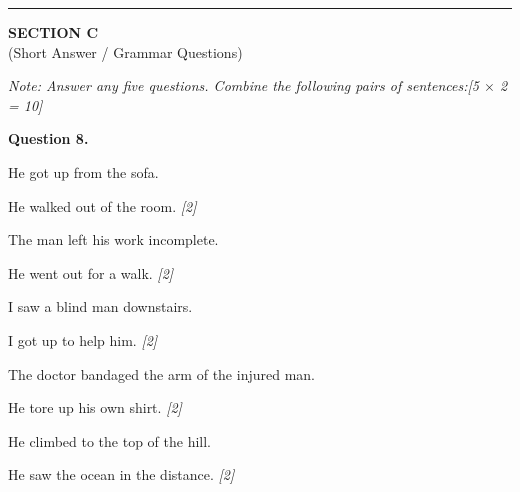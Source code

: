 \documentclass[11pt,a4paper]{article}
\newcommand{\pts}[1]{\hfill \textit{[#1]}}
\begin{document}
\bigskip
\rule{\linewidth}{0.2pt}
\bigskip

\begin{center}
  {\large\bfseries SECTION C}\\[2pt]
  {\normalsize (Short Answer / Grammar Questions)}
\end{center}

\noindent \textit{Note: Answer any five questions. Combine the following pairs of sentences:}\pts{5 $\times$ 2 = 10}

\bigskip

\noindent \textbf{Question 8.}
\begin{parts}
  \item
        \begin{parts}
          \item He got up from the sofa.
          \item He walked out of the room. \pts{2}
        \end{parts}

  \item
        \begin{parts}
          \item The man left his work incomplete.
          \item He went out for a walk. \pts{2}
        \end{parts}

  \item
        \begin{parts}
          \item I saw a blind man downstairs.
          \item I got up to help him. \pts{2}
        \end{parts}

  \item
        \begin{parts}
          \item The doctor bandaged the arm of the injured man.
          \item He tore up his own shirt. \pts{2}
        \end{parts}

  \item
        \begin{parts}
          \item He climbed to the top of the hill.
          \item He saw the ocean in the distance. \pts{2}
        \end{parts}


\end{parts}
\end{document}
